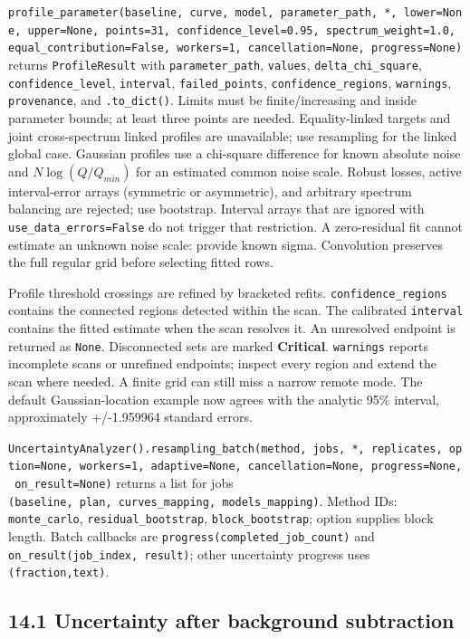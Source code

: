 \documentclass[
  10pt,
  a4paper,
  oneside]{scrreprt}
\begin{document}
\texttt{profile\_parameter(baseline,\ curve,\ model,\ parameter\_path,\ *,\ lower=None,\ upper=None,\ points=31,\ confidence\_level=0.95,\ spectrum\_weight=1.0,\ equal\_contribution=False,\ workers=1,\ cancellation=None,\ progress=None)}
returns \texttt{ProfileResult} with \texttt{parameter\_path},
\texttt{values}, \texttt{delta\_chi\_square},
\texttt{confidence\_level}, \texttt{interval}, \texttt{failed\_points},
\texttt{confidence\_regions}, \texttt{warnings}, \texttt{provenance},
and \texttt{.to\_dict()}. Limits must be finite/increasing and inside
parameter bounds; at least three points are needed. Equality-linked
targets and joint cross-spectrum linked profiles are unavailable; use
resampling for the linked global case. Gaussian profiles use a
chi-square difference for known absolute noise and \(N\log(Q/Q_{min})\)
for an estimated common noise scale. Robust losses, active
interval-error arrays (symmetric or asymmetric), and arbitrary spectrum
balancing are rejected; use bootstrap. Interval arrays that are ignored
with \texttt{use\_data\_errors=False} do not trigger that restriction. A
zero-residual fit cannot estimate an unknown noise scale: provide known
sigma. Convolution preserves the full regular grid before selecting
fitted rows.

Profile threshold crossings are refined by bracketed refits.
\texttt{confidence\_regions} contains the connected regions detected
within the scan. The calibrated \texttt{interval} contains the fitted
estimate when the scan resolves it. An unresolved endpoint is returned
as \texttt{None}. Disconnected sets are marked \textbf{Critical}.
\texttt{warnings} reports incomplete scans or unrefined endpoints;
inspect every region and extend the scan where needed. A finite grid can
still miss a narrow remote mode. The default Gaussian-location example
now agrees with the analytic 95\% interval, approximately +/-1.959964
standard errors.

\texttt{UncertaintyAnalyzer().resampling\_batch(method,\ jobs,\ *,\ replicates,\ option=None,\ workers=1,\ adaptive=None,\ cancellation=None,\ progress=None,\ on\_result=None)}
returns a list for jobs
\texttt{(baseline,\ plan,\ curves\_mapping,\ models\_mapping)}. Method
IDs: \texttt{monte\_carlo}, \texttt{residual\_bootstrap},
\texttt{block\_bootstrap}; option supplies block length. Batch callbacks
are \texttt{progress(completed\_job\_count)} and
\texttt{on\_result(job\_index,\ result)}; other uncertainty progress
uses \texttt{(fraction,text)}.

\hypertarget{uncertainty-after-background-subtraction}{%
\subsection{14.1 Uncertainty after background
subtraction}\label{uncertainty-after-background-subtraction}}
\end{document}
